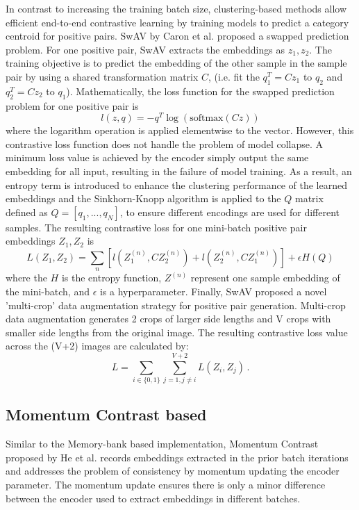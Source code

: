 \documentclass[12pt,twoside]{report}
\begin{document}
In contrast to increasing the training batch size, clustering-based methods allow efficient end-to-end contrastive learning by training models to predict a category centroid for positive pairs. SwAV by Caron et al.\cite{swav} proposed a swapped prediction problem. For one positive pair, SwAV extracts the embeddings as $z_1, z_2$. The training objective is to predict the embedding of the other sample in the sample pair by using a shared transformation matrix $C$, (i.e. fit the $q_1^T = C z_1$ to $q_2$ and $q_2^T = C z_2$ to $q_1$). Mathematically, the loss function for the swapped prediction problem for one positive pair is $$l(z, q) = - q^T \log(\text{softmax}(C z))$$where the logarithm operation is applied elementwise to the vector. However, this contrastive loss function does not handle the problem of model collapse. A minimum loss value is achieved by the encoder simply output the same embedding for all input, resulting in the failure of model training. As a result, an entropy term is introduced to enhance the clustering performance of the learned embeddings and the Sinkhorn-Knopp algorithm is applied to the $Q$ matrix defined as $Q = [q_1, ..., q_N]$, to ensure different encodings are used for different samples. The resulting contrastive loss for one mini-batch positive pair embeddings $Z_1, Z_2$ is $$L(Z_1, Z_2) = \sum_{n}[l(Z_1^{(n)}, C Z_2^{(n)}) + l(Z_2^{(n)}, C Z_1^{(n)})] + \epsilon H(Q)$$where the $H$ is the entropy function, $Z^{(n)}$ represent one sample embedding of the mini-batch, and $\epsilon$ is a hyperparameter. Finally, SwAV proposed a novel 'multi-crop' data augmentation strategy for positive pair generation. Multi-crop data augmentation generates 2 crops of larger side lengths and V crops with smaller side lengths from the original image. The resulting contrastive loss value across the (V+2) images are calculated by: $$L = \sum_{i \in \{0, 1\}} \sum_{j = 1, j \neq i}^{V+2} L(Z_i, Z_j)\,.$$

\subsection{Momentum Contrast based}
Similar to the Memory-bank based implementation, Momentum Contrast proposed by He et al.\cite{moco} records embeddings extracted in the prior batch iterations and addresses the problem of consistency by momentum updating the encoder parameter. The momentum update ensures there is only a minor difference between the encoder used to extract embeddings in different batches.\\
\end{document}
